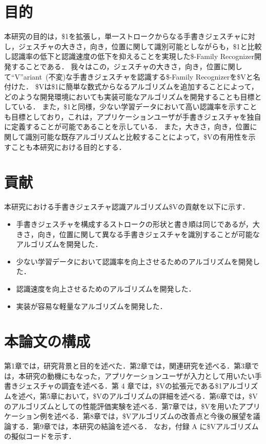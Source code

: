 \section{目的}
本研究の目的は，\$1を拡張し，単一ストロークからなる手書きジェスチャに対し，ジェスチャの大きさ，向き，位置に関して識別可能としながらも，\$1と比較し認識率の低下と認識速度の低下を抑えることを実現した\$-Family Recognizer開発することである．
我々はこの，ジェスチャの大きさ，向き，位置に関して``V''ariant~(不変)な手書きジェスチャを認識する\$-Family Recognizerを\$Vと名付けた．
\$Vは\$1に簡単な数式からなるアルゴリズムを追加することによって，どのような開発環境においても実装可能なアルゴリズムを開発することも目標としている．
また，\$1と同様，少ない学習データにおいて高い認識率を示すことも目標としており，これは，アプリケーションユーザが手書きジェスチャを独自に定義することが可能であることを示している．
また，大きさ，向き，位置に関して識別可能な既存アルゴリズムと比較することによって，\$Vの有用性を示すことも本研究における目的とする．



\section{貢献}
本研究における手書きジェスチャ認識アルゴリズム\$Vの貢献を以下に示す．
\begin{itemize}
\item 手書きジェスチャを構成するストロークの形状と書き順は同じであるが，大きさ，向き，位置に関して異なる手書きジェスチャを識別することが可能なアルゴリズムを開発した．
\item 少ない学習データにおいて認識率を向上させるためのアルゴリズムを開発した．
\item 認識速度を向上させるためのアルゴリズムを開発した．
\item 実装が容易な軽量なアルゴリズムを開発した．
\end{itemize}

\section{本論文の構成}
第1章では，研究背景と目的を述べた．第2章では，関連研究を述べる．第3章では，本研究の動機にもなった，アプリケーションユーザが入力として用いたい手書きジェスチャの調査を述べる．第 4 章では，\$Vの拡張元である\$1アルゴリズムを述べ，第5章において，\$Vのアルゴリズムの詳細を述べる．第6章では，\$Vのアルゴリズムとしての性能評価実験を述べる．第7章では，\$Vを用いたアプリケーション例を述べる．第8章では，\$Vアルゴリズムの改善点と今後の展望を議論する．第9章では，本研究の結論を述べる．
なお，付録 A に\$Vアルゴリズムの擬似コードを示す．
